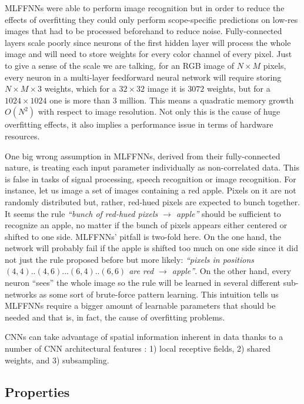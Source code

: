 MLFFNNs were able to perform image recognition \cite{Zhang1999} but in order to reduce the effects of overfitting they could only perform scope-specific predictions on low-res images that had to be processed beforehand to reduce noise.
Fully-connected layers scale poorly since neurons of the first hidden layer will process the whole image and will need to store weights for every color channel of every pixel.
Just to give a sense of the scale we are talking, for an RGB image of ${N}\times{M}$ pixels, every neuron in a multi-layer feedforward neural network will require storing ${N}\times{M}\times{3}$ weights, which for a ${32}\times{32}$ image it is $3072$ weights, but for a ${1024}\times{1024}$ one is more than $3$ million.
This means a quadratic memory growth $O(N^2)$ with respect to image resolution.
Not only this is the cause of huge overfitting effects, it also implies a performance issue in terms of hardware resources.

One big wrong assumption in MLFFNNs, derived from their fully-connected nature, is treating each input parameter individually as non-correlated data.
This is false in tasks of signal processing, speech recognition or image recognition.
For instance, let us image a set of images containing a red apple.
Pixels on it are not randomly distributed but, rather, red-hued pixels are expected to bunch together.
It seems the rule \emph{``bunch of red-hued pixels $\rightarrow$ apple''} should be sufficient to recognize an apple, no matter if the bunch of pixels appears either centered or shifted to one side.
MLFFNNs' pitfall is two-fold here.
On the one hand, the network will probably fail if the apple is shifted too much on one side since it did not just the rule proposed before but more likely: \emph{``pixels in positions $(4, 4)..(4, 6)...(6, 4)..(6, 6)$ are red $\rightarrow$ apple''}.
On the other hand, every neuron ``sees'' the whole image so the rule will be learned in several different sub-networks as some sort of brute-force pattern learning.
This intuition tells us MLFFNNs require a bigger amount of learnable parameters that should be needed and that is, in fact, the cause of overfitting problems.

CNNs can take advantage of spatial information inherent in data thanks to a number of CNN architectural features \cite{LeCun1998}: 1) local receptive fields, 2) shared weights, and 3) subsampling.


\subsection{Properties}
\label{sub:concepts:convnets:properties}

